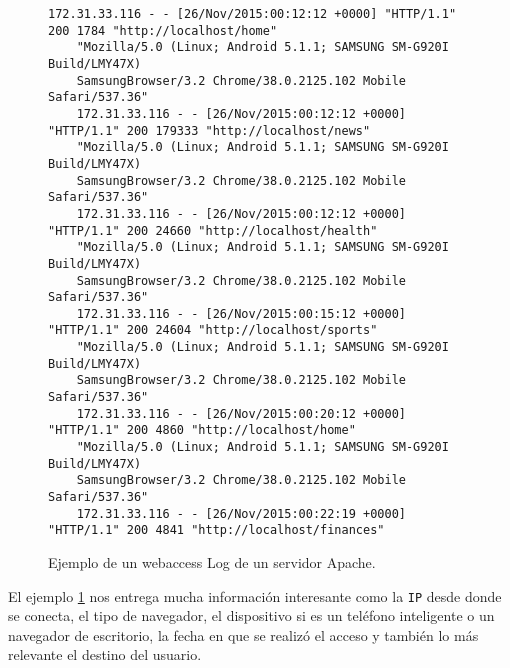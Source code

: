 \begin{figure}[h] 
	\centering
	\begin{lstlisting}[frame=single,basicstyle=\ttfamily\tiny,]
	172.31.33.116 - - [26/Nov/2015:00:12:12 +0000] "HTTP/1.1" 200 1784 "http://localhost/home" 
	"Mozilla/5.0 (Linux; Android 5.1.1; SAMSUNG SM-G920I Build/LMY47X) 
	SamsungBrowser/3.2 Chrome/38.0.2125.102 Mobile Safari/537.36"
	172.31.33.116 - - [26/Nov/2015:00:12:12 +0000] "HTTP/1.1" 200 179333 "http://localhost/news" 
	"Mozilla/5.0 (Linux; Android 5.1.1; SAMSUNG SM-G920I Build/LMY47X) 
	SamsungBrowser/3.2 Chrome/38.0.2125.102 Mobile Safari/537.36"
	172.31.33.116 - - [26/Nov/2015:00:12:12 +0000] "HTTP/1.1" 200 24660 "http://localhost/health" 
	"Mozilla/5.0 (Linux; Android 5.1.1; SAMSUNG SM-G920I Build/LMY47X) 
	SamsungBrowser/3.2 Chrome/38.0.2125.102 Mobile Safari/537.36"
	172.31.33.116 - - [26/Nov/2015:00:15:12 +0000] "HTTP/1.1" 200 24604 "http://localhost/sports" 
	"Mozilla/5.0 (Linux; Android 5.1.1; SAMSUNG SM-G920I Build/LMY47X) 
	SamsungBrowser/3.2 Chrome/38.0.2125.102 Mobile Safari/537.36"
	172.31.33.116 - - [26/Nov/2015:00:20:12 +0000] "HTTP/1.1" 200 4860 "http://localhost/home" 
	"Mozilla/5.0 (Linux; Android 5.1.1; SAMSUNG SM-G920I Build/LMY47X) 
	SamsungBrowser/3.2 Chrome/38.0.2125.102 Mobile Safari/537.36"
	172.31.33.116 - - [26/Nov/2015:00:22:19 +0000] "HTTP/1.1" 200 4841 "http://localhost/finances" 
	\end{lstlisting}
	
	
	
	\caption{Ejemplo de un webaccess Log de un servidor Apache.}
	\label{fig:accesslog-apache-teleton}
\end{figure}


  El ejemplo \ref{fig:accesslog-apache-teleton} nos entrega mucha información interesante como la \texttt{IP} desde donde se conecta, el tipo de navegador, el dispositivo si es un teléfono inteligente o un navegador de escritorio, la fecha en que se realizó el acceso y también lo más relevante el destino del usuario.
  
  
  
  